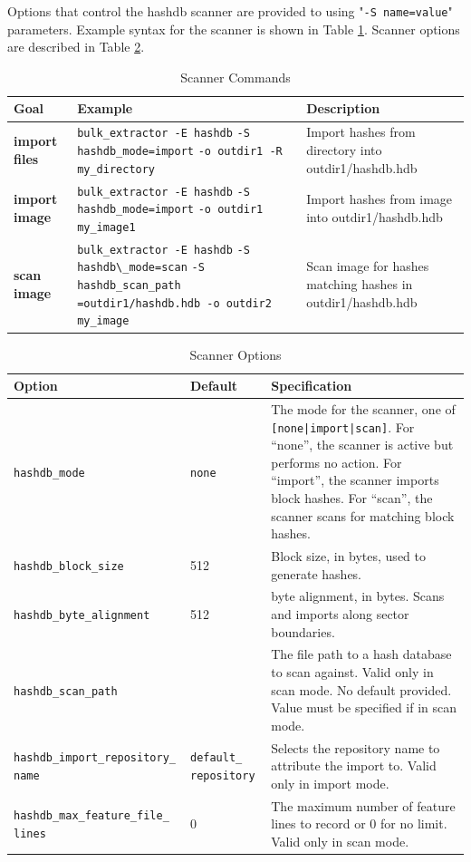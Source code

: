 \documentclass[11pt,fleqn]{article} %
\begin{document}
Options that control the hashdb
scanner are provided to \bulk using "\verb+-S name=value+" parameters.
Example syntax for the \bulk \hdb scanner is shown in Table \ref{tab:hashdbScanner}.
Scanner options are described in Table \ref{tab:hashdb_be_usage}.

\begin{table}[!ht]
\centering
\caption{\bulk \hdb Scanner Commands}
\label{tab:hashdbScanner}
\begin{tabular}{|p{3.5 cm}|p{6 cm}|p{4 cm}|}
\hline \hline
\textbf{Goal} & \textbf{Example} & \textbf{Description} \\
\hline
\textbf{import files} & \verb+bulk_extractor -E hashdb+ \verb+-S hashdb_mode=import+ \verb+-o outdir1 -R my_directory+ & Import hashes from directory into outdir1/hashdb.hdb\\
\hline
\textbf{import image} & \verb+bulk_extractor -E hashdb+ \verb+-S hashdb_mode=import+ \verb+-o outdir1 my_image1+ & Import hashes from image into outdir1/hashdb.hdb\\
\hline
\textbf{scan image} & \verb+bulk_extractor -E hashdb+ \verb+-S hashdb\_mode=scan+ \verb+-S hashdb_scan_path+ \verb+=outdir1/hashdb.hdb -o outdir2+ \verb+my_image+ & Scan image for hashes matching hashes in outdir1/hashdb.hdb\\
\hline
\end{tabular}
\end{table}

\begin{table}[!ht]

\centering
\caption{\bulk \hdb Scanner Options}
\label{tab:hashdb_be_usage}
\begin{tabular}{|p{5 cm}|p{2.0 cm}|p{6.5 cm}|}
\hline \hline
\textbf{Option} & \textbf{Default} & \textbf{Specification} \\
\hline
\verb+hashdb_mode+ & \verb+none+ & The mode for the scanner, one of \verb+[none|import|scan]+. For ``none'', the scanner is active but performs no action. For ``import'', the scanner imports block hashes. For ``scan'', the scanner scans for matching block hashes.\\
\hline
\verb+hashdb_block_size+ &512 & Block size, in bytes, used to generate hashes.\\
\hline
\verb+hashdb_byte_alignment+ &512 & byte alignment, in bytes.  Scans and imports along sector boundaries.\\
\hline
\verb+hashdb_scan_path+ & & The file path to a hash database to scan against.  Valid only in scan mode. No default provided. Value must be specified if in scan mode.\\
\hline
\verb+hashdb_import_repository_+ \verb+name+ & \verb+default_+ \verb+repository+ &Selects the repository name to attribute the import to.  Valid only in import mode.\\
\hline
\verb+hashdb_max_feature_file_+ \verb+lines+ & 0 &The maximum number of feature lines to record or 0 for no limit.  Valid only in scan mode.\\
\hline
\end{tabular}
\end{table}
\end{document}

